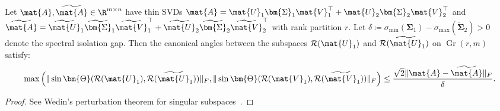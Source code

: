 \begin{lemma}
\label{lem:wedin_subspace_preliminaries}
Let $\mat{A}, \widetilde{\mat{A}} \in \R^{m \times n}$ have thin SVDs $\mat{A} = \mat{U}_1 \bm{\Sigma}_1 \mat{V}_1^\top + \mat{U}_2 \bm{\Sigma}_2 \mat{V}_2^\top$ and $\widetilde{\mat{A}} = \widetilde{\mat{U}}_1 \widetilde{\bm{\Sigma}}_1 \widetilde{\mat{V}}_1^\top + \widetilde{\mat{U}}_2 \widetilde{\bm{\Sigma}}_2 \widetilde{\mat{V}}_2^\top$ with rank partition $r$.
Let $\delta \coloneqq \sigma_{\min}(\bm{\Sigma}_1) - \sigma_{\max}(\widetilde{\bm{\Sigma}}_2) > 0$ denote the spectral isolation gap.
Then the canonical angles between the subspaces $\mathcal{R}(\mat{U}_1)$ and $\mathcal{R}(\widetilde{\mat{U}}_1)$ on $\operatorname{Gr}(r, m)$ satisfy:
\begin{equation}
\max\left( \|\sin \bm{\Theta}(\mathcal{R}(\mat{U}_1), \mathcal{R}(\widetilde{\mat{U}}_1))\|_F, \|\sin \bm{\Theta}(\mathcal{R}(\mat{V}_1), \mathcal{R}(\widetilde{\mat{V}}_1))\|_F \right) \le \frac{\sqrt{2} \|\mat{A} - \widetilde{\mat{A}}\|_F}{\delta}.
\label{eq:wedin_subspace_sin_theta}
\end{equation}
\end{lemma}

\begin{proof}
See Wedin's perturbation theorem for singular subspaces~\cite{edelman1998geometry,golub2013matrix}.
\end{proof}

